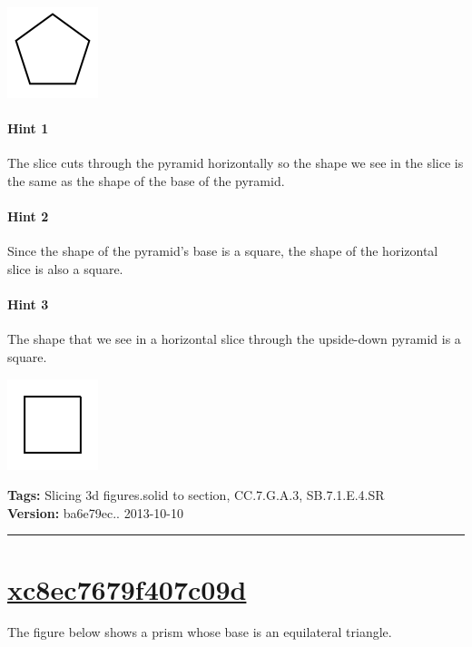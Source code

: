\documentclass[twocolumn,10pt]{article}
\def\shrinkfactor{0.4}
\begin{document}
\includegraphics[scale=\shrinkfactor]{figures/498a6b09730fdba2360826c138eeee142e8cccc1.png}



\paragraph{Hint 1}The slice cuts through the pyramid horizontally so the shape we see in the slice is the same as the shape of the base of the pyramid.

\paragraph{Hint 2}Since the shape of the pyramid's base is a square, the shape of the horizontal slice is also a square.

\paragraph{Hint 3}The shape that we see in a horizontal slice through the upside-down pyramid is a square.  

\includegraphics[scale=\shrinkfactor]{figures/4b59a0ece6acc7c19c389e1de534d1df93bf1169.png}



\medskip
\noindent
\textbf{Tags:} {\footnotesize Slicing 3d figures.solid to section, CC.7.G.A.3, SB.7.1.E.4.SR}\\
\textbf{Version:} ba6e79ec.. 2013-10-10
\smallskip\hrule





\section{\href{https://www.khanacademy.org/devadmin/content/items/xc8ec7679f407c09d}{xc8ec7679f407c09d}}

\noindent
The figure below shows a prism whose base is an equilateral triangle.
\end{document}
